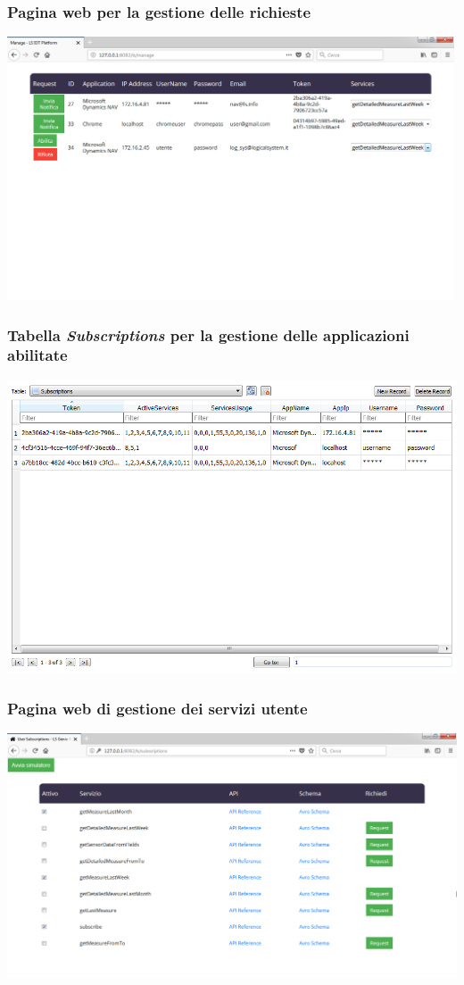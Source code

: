\documentclass{beamer}
\begin{document}
\begin{frame}
\frametitle{Pagina web per la gestione delle richieste}
\includegraphics[width=1\textwidth]{images/managePagePlatform.png}
\end{frame}

\begin{frame}
\frametitle{Tabella \textit{Subscriptions} per la gestione delle applicazioni abilitate}
\includegraphics[width=1\textwidth]{images/DBPlatform3.png}
\end{frame}

\begin{frame}
\frametitle{Pagina web di gestione dei servizi utente}
\includegraphics[width=1\textwidth]{images/UserSubscriptionsPlatform.png}
\end{frame}
\end{document}
